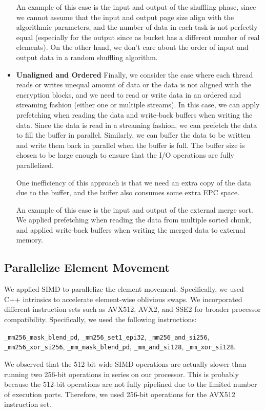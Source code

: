 \documentclass{article}
\begin{document}
\begin{itemize}
    An example of this case is the input and output of the shuffling phase, since we cannot assume that the input and output page size align with the algorithmic parameters, and the number of data in each task is not perfectly equal (especially for the output since as bucket has a different number of real elements). On the other hand, we don't care about the order of input and output data in a random shuffling algorithm.
    \item {\bf Unaligned and Ordered}
    Finally, we consider the case where each thread reads or writes unequal amount of data or the data is not aligned with the encryption blocks, and we need to read or write data in an ordered and streaming fashion (either one or multiple streams). In this case, we can apply prefetching when reading the data and write-back buffers when writing the data. Since the data is read in a streaming fashion, we can prefetch the data to fill the buffer in parallel. Similarly, we can buffer the data to be written and write them back in parallel when the buffer is full. The buffer size is chosen to be large enough to ensure that the I/O operations are fully parallelized.

    One inefficiency of this approach is that we need an extra copy of the data due to the buffer, and the buffer also consumes some extra EPC space. 

    An example of this case is the input and output of the external merge sort. We applied prefetching when reading the data from multiple sorted chunk, and applied write-back buffers when writing the merged data to external memory.
\end{itemize}
\subsection{Parallelize Element Movement}
\label{sec:simd}
We applied SIMD to parallelize the element movement. Specifically, we used C++ intrinsics to accelerate element-wise oblivious swaps. We incorporated different instruction sets such as AVX512, AVX2, and SSE2 for broader processor compatibility. Specifically, we used the following instructions: 

{\tt \_mm256\_mask\_blend\_pd}, {\tt \_mm256\_set1\_epi32}, {\tt \_mm256\_and\_si256},\\ {\tt \_mm256\_xor\_si256}, {\tt \_mm\_mask\_blend\_pd}, {\tt \_mm\_and\_si128}, {\tt \_mm\_xor\_si128}. 

We observed that the 512-bit wide SIMD operations are actually slower than running two 256-bit operations in series on our processor. This is probably because the 512-bit operations are not fully pipelined due to the limited number of execution ports. Therefore, we used 256-bit operations for the AVX512 instruction set.
\end{document}
